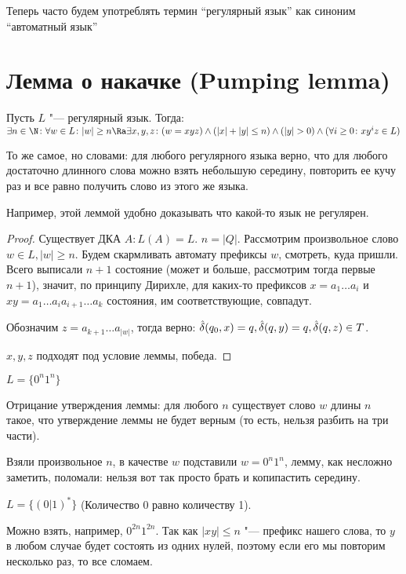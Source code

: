 \begin{Rem}
Теперь часто будем употреблять термин ``регулярный язык'' как синоним ``автоматный язык''
\end{Rem}



\section{Лемма о накачке (Pumping lemma)}
\begin{theorem}
Пусть $L$ "--- регулярный язык. Тогда: $\exists n \in \N \colon \forall w \in L \colon |w| \geq n \Ra \exists x, y, z \colon (w=xyz) \land (|x| + |y| \leq n) \land (|y| > 0) \land (\forall i \geq 0\colon xy^iz \in L)$ 

То же самое, но словами: для любого регулярного языка верно, что для любого достаточно длинного слова можно взять небольшую середину, повторить ее кучу раз и все равно получить слово из этого же языка.

Например, этой леммой удобно доказывать что какой-то язык не регулярен.
\end{theorem}
\begin{proof}
Существует ДКА $A \colon L(A) = L$. $n = |Q|$. Рассмотрим произвольное слово $w \in L, |w| \geq n$.
Будем скармливать автомату префиксы $w$, смотреть, куда пришли. Всего выписали $n+1$ состояние (может и больше, рассмотрим тогда первые $n + 1$), значит, 
по принципу Дирихле, для каких-то префиксов $x = a_1 \dots a_i$ и $xy = a_1 \dots a_ia_{i+1} \dots a_k$ состояния, им соответствующие, совпадут.

Обозначим $z = a_{k+1}\dots a_{|w|}$, тогда верно: 
$\\
\hat\delta(q_0, x) = q,\\ 
\hat\delta(q, y) = q,\\
\hat\delta(q, z) \in T$.

$x, y, z$ подходят под условие леммы, победа.

\end{proof}              
\begin{exmp}
$L = \{0^n1^n\}$

Отрицание утверждения леммы: для любого $n$ существует слово $w$ длины $n$ такое, что утверждение леммы не будет верным (то есть, нельзя разбить на три части).


Взяли произвольное $n$, в качестве $w$ подставили $w=0^n1^n$, лемму, как несложно заметить, поломали: нельзя вот так просто брать и копипастить середину.
\end{exmp}
\begin{exmp}
$L = \{(0|1)^*\}$ (Количество 0 равно количеству 1).

Можно взять, например, $0^{2n}1^{2n}$. Так как $|xy| \leq n$ "--- префикс нашего слова, то $y$ в любом случае будет состоять из одних нулей, поэтому если его мы повторим несколько раз, то все сломаем.
\end{exmp}
